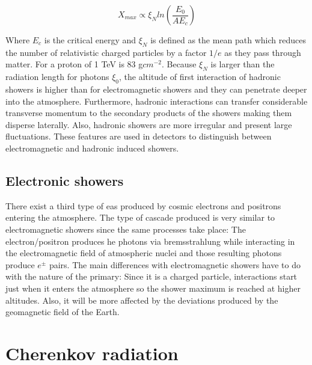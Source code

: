 \documentclass[main.tex]{subfiles}
\begin{document}
\begin{equation}
  X_{max} \propto \xi_{N} ln \left( \frac{E_0}{AE_c}\right)
\end{equation}

Where $E_c$ is the critical energy and $\xi_{N}$ is defined as the mean path which reduces the number of relativistic charged particles by a factor $1/e$ as they pass through matter. For a proton of 1 TeV is 83 g$cm^{-2}$. Because $\xi_{N}$ is larger than the radiation length for photons $\xi_{0}$, the altitude of first interaction of hadronic showers is higher than for electromagnetic showers and they can penetrate deeper into the atmosphere.
Furthermore, hadronic interactions can transfer considerable transverse momentum to the secondary products of the showers making them disperse laterally. Also, hadronic showers are more irregular and present large fluctuations. These features are used in detectors to distinguish between electromagnetic and hadronic induced showers.

\subsection{Electronic showers} \label{sec:electroshowers}

There exist a third type of \gls{eas} produced by cosmic electrons and positrons entering the atmosphere. The type of cascade produced is very similar to electromagnetic showers since the same processes take place: The electron/positron produces \gls{he} photons via bremsstrahlung while interacting in the electromagnetic field of atmospheric nuclei and those resulting photons produce $e^{\pm}$ pairs. The main differences with electromagnetic showers have to do with the nature of the primary: Since it is a charged particle, interactions start just when it enters the atmosphere so the shower maximum is reached at higher altitudes. Also, it will be more affected by the deviations produced by the geomagnetic field of the Earth.

\section{Cherenkov radiation}\label{sec:cherenkov}
\end{document}
